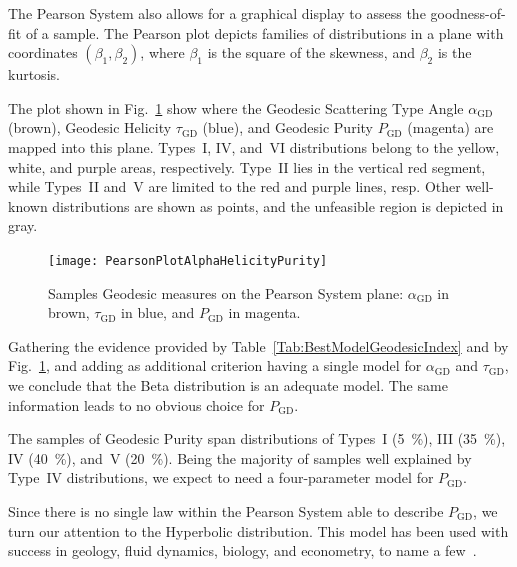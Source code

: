 \documentclass[journal]{IEEEtran}
\begin{document}
{The Pearson System also allows for a graphical display to assess the goodness-of-fit of a sample.
The Pearson plot depicts families of distributions in a plane with coordinates $(\beta_1,\beta_2)$, where $\beta_1$ is the square of the skewness, and $\beta_2$ is the kurtosis.

The plot shown in Fig.~\ref{Fig:PearsonPlanes} show where 
the Geodesic Scattering Type Angle $\alpha_{\text{GD}}$ (brown),
Geodesic Helicity $\tau_{\text{GD}}$ (blue),
and Geodesic Purity $P_{\text{GD}}$ (magenta)
are mapped into this plane.
Types~I, IV, and~VI distributions belong to the yellow, white, and purple areas, respectively.
Type~II lies in the vertical red segment, while Types~II and~V are limited to the red and purple lines, resp.
Other well-known distributions are shown as points, and the unfeasible region is depicted in gray.

\begin{figure}
\centering
\texttt{[image: PearsonPlotAlphaHelicityPurity]}
	\caption{Samples Geodesic measures on the Pearson System plane: $\alpha_{\text{GD}}$ in brown, $\tau_{\text{GD}}$ in blue, and $P_{\text{GD}}$ in magenta.}\label{Fig:PearsonPlanes}
\end{figure}

Gathering the evidence provided by Table~\ref{Tab:BestModelGeodesicIndex} and by Fig.~\ref{Fig:PearsonPlanes}, and adding as additional criterion having a single model for $\alpha_{\text{GD}}$ and $\tau_{\text{GD}}$, we conclude that the Beta distribution is an adequate model.
The same information leads to no obvious choice for $P_{\text{GD}}$.

The samples of Geodesic Purity span distributions of Types~I (\SI{5}{\percent}),
III (\SI{35}{\percent}), 
IV (\SI{40}{\percent}), 
and~V (\SI{20}{\percent}).
Being the majority of samples well explained by Type~IV distributions, we expect to need a four-parameter model for $P_{\text{GD}}$.

Since there is no single law within the Pearson System able to describe $P_{\text{GD}}$, we turn our attention to the Hyperbolic distribution.
This model has been used with success in geology, fluid dynamics, biology, and econometry, to name a few~\cite{ErosionDepositionandSizeDistributionsofSand}.

}
\end{document}

